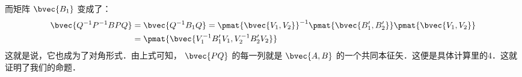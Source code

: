 而矩阵 $\bvec{B_1}$ 变成了：
\begin{equation}
\begin{aligned}
\bvec{Q^{-1}P^{-1}BPQ}&=\bvec{Q^{-1}B_1Q}=\pmat{\bvec{V_1,V_2}}^{-1}\pmat{\bvec{B'_1,B'_2}}\pmat{\bvec{V_1,V_2}}\\
&=\pmat{\bvec{V_1^{-1}B'_1V_1,V_2^{-1}B'_2V_2}}\\
\end{aligned}
\end{equation}
这就是说，它也成为了对角形式．由上式可知， $\bvec{PQ}$ 的每一列就是 $\bvec{A,B}$ 的一个共同本征矢．这便是具体计算里的4．这就证明了我们的命题．


